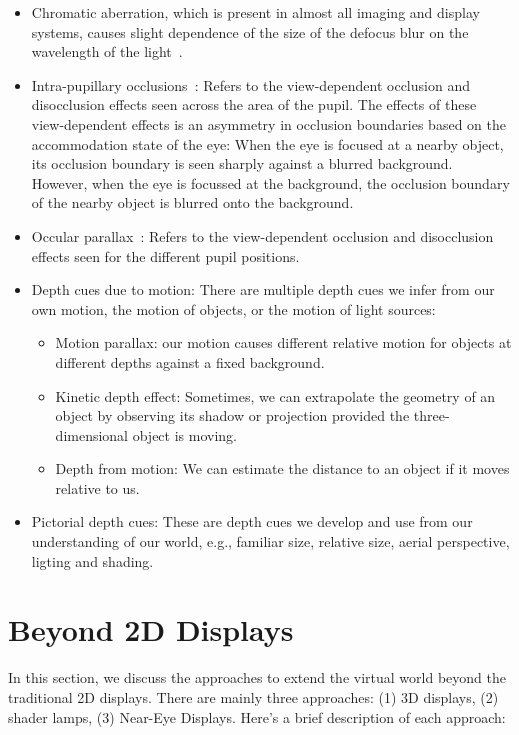 \begin{itemize}
\item Chromatic aberration, which is present in almost all imaging and display systems, causes slight dependence of the size of the defocus blur on the wavelength of the light~\cite{cholewiak2017chromablur}.
\item Intra-pupillary occlusions~\cite{zannoli2016blur}: Refers to the view-dependent occlusion and disocclusion effects seen across the area of the pupil. The effects of these view-dependent effects is an asymmetry in occlusion boundaries based on the accommodation state of the eye: When the eye is focused at a nearby object, its occlusion boundary is seen sharply against a blurred background. However, when the eye is focussed at the background, the occlusion boundary of the nearby object is blurred onto the background. 
\item Occular parallax~\cite{Konrad:2019:OcularParallax}: Refers to the view-dependent occlusion and disocclusion effects seen for the different pupil positions. 
\item Depth cues due to motion: There are multiple depth cues we infer from our own motion, the motion of objects, or the motion of light sources: 
\begin{itemize}
\item Motion parallax: our motion causes different relative motion for objects at different depths against a fixed background.
\item Kinetic depth effect: Sometimes, we can extrapolate the geometry of an object by observing its shadow or projection provided the three-dimensional object is moving. 
\item Depth from motion: We can estimate the distance to an object if it moves relative to us. 
\end{itemize}
\item Pictorial depth cues: These are depth cues we develop and use from our understanding of our world, e.g., familiar size, relative size, aerial perspective, ligting and shading. 
\end{itemize}

\section{Beyond 2D Displays}
\label{sec:background:beyond_2d_displays}
In this section, we discuss the approaches to extend the virtual world beyond the traditional 2D displays. 
There are mainly three approaches: (1) 3D displays, (2) shader lamps, (3) Near-Eye Displays. 
Here’s a brief description of each approach:

